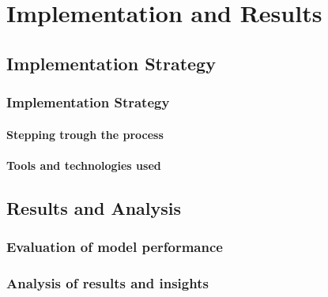 \chapter{Implementation and Results}

\section{Implementation Strategy}
\subsection{Implementation Strategy}
\subsubsection{Stepping trough the process}
\subsubsection{Tools and technologies used}

\section{Results and Analysis}
\subsection{Evaluation of model performance}
\subsection{Analysis of results and insights}